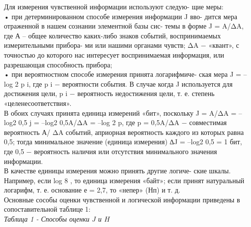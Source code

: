 \documentclass[a4paper,12pt]{report}
\begin{document}
Для измерения чувственной информации используют следую-
щие меры:\\
• при детерминированном способе измерения информации J вво-
дится мера отраженной в нашем сознании элементной базы сис-
темы в форме J = A/ΔA, где А – общее количество каких-либо
знаков событий, воспринимаемых измерительными прибора-
ми или нашими органами чувств; ΔA − «квант», с точностью
до которого нас интересует воспринимаемая информация, или
разрешающая способность прибора;\\
• при вероятностном способе измерения принята логарифмиче-
ская мера J = –log 2 p i, где p i − вероятности события. В случае когда J используется для достижения цели, p i − вероятность недостижения цели, т. е. степень «целенесоответствия».\\
В обоих случаях принята единица измерений «бит», поскольку
J = A/ΔA = –log2 0,5 j = –log2 0,5A/ΔA = –log 2 p, где p = 0,5A/ΔA − совместимая вероятность А/
ΔA событий, априорная вероятность каждого из
которых равна 0,5; тогда минимальное значение (единица измерения)
∆J = –log2 0,5 = 1 бит, где 0,5 − вероятность наличия или отсутствия
минимального значения информации.\\
В качестве единицы измерения можно принять другие логиче-
ские шкалы. Например, если log 8 , то единица измерения «байт»; если
принят натуральный логарифм, т. е. основание е = 2,7, то «непер»
(Нп) и т. д.\\
Основные сособы оценки чувственной и логической информации приведены в сопоставительной таблице 1:\\

\textit{Таблица 1 - Способы оценки $J$ и $H$}
\end{document}
